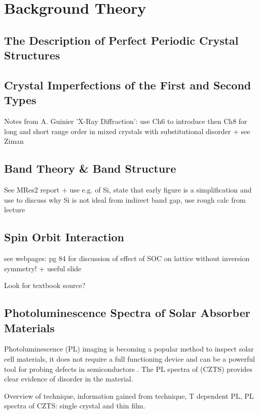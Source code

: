 
\chapter{Background Theory}

\label{ch:background}

\section{The Description of Perfect Periodic Crystal Structures}

\section{Crystal Imperfections of the First and Second Types}
Notes from A. Guinier 'X-Ray Diffraction': use Ch6 to introduce then Ch8 for long and short range order in mixed crystals with substitutional disorder + see Ziman

\section{Band Theory \& Band Structure}\label{band_theory}
See MRes2 report + use e.g. of Si, state that early figure is a simplification and use to discuss why Si is not ideal from indirect band gap, use rough calc from lecture

\section{Spin Orbit Interaction}
 see webpages: pg 84 for discussion of effect of SOC on lattice without inversion symmetry!  + useful slide

Look for textbook source?

\section{Photoluminescence Spectra of Solar Absorber Materials}\label{PL_section}
Photoluminescence (PL) imaging is becoming a popular method to inspect solar cell materials, it does not require a full functioning device and can be a powerful tool for probing defects in semiconductors \cite{characterization_book, Gerschon}. The PL spectra of \CZTS (CZTS) provides clear evidence of disorder in the material.

Overview of technique, information gained from technique, T dependent PL, PL spectra of CZTS: single crystal and thin film.

